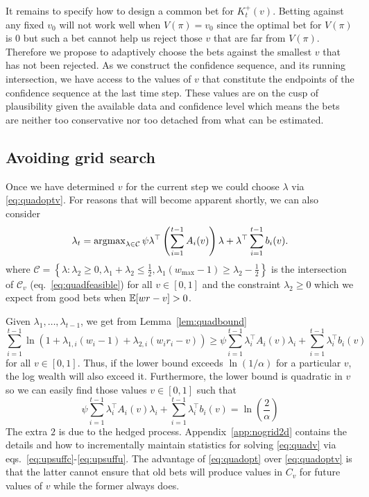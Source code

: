 It remains to specify how to design a common bet
for $K_t^{+}(v)$.
Betting against any fixed $v_0$ 
will not work well when $V(\pi)=v_0$
since the optimal bet for $V(\pi)$ is 0 but
such a bet cannot help us reject those $v$ that are far from
$V(\pi)$. Therefore we propose to adaptively choose
the bets against the smallest $v$ 
that has not been rejected. As we 
construct the confidence sequence, and its running 
intersection, we have access to the values of $v$
that constitute the endpoints of the confidence sequence
at the last time step. These values are on the cusp of
plausibility given the available data and confidence level
which means the bets are neither too conservative nor 
too detached from what can be estimated.

\subsection{Avoiding grid search}

Once we have determined $v$ for the current step we could 
choose $\lambda$ via \eqref{eq:quadoptv}. For reasons 
that will become apparent shortly, we can also consider
\begin{equation}
\lambda_t = \operatorname{argmax}_{\lambda \in \mathcal{C}}
\psi  \lambda^\top \left(\sum_{i=1}^{t-1} A_i(v)\right) \lambda 
+ \lambda^\top \sum_{i=1}^{t-1} b_i(v).
\label{eq:quadopt}
\end{equation}
where $\mathcal{C}=\left\{\lambda: \lambda_2\geq 0, 
\lambda_1 + \lambda_2 \leq \frac{1}{2},
\lambda_1 \left(w_{\max}-1\right) \geq \lambda_2 -\frac{1}{2}
\right\}$ is the intersection of $\mathcal{C}_v$ 
(eq.~\eqref{eq:quadfeasible}) for all $v \in [0,1]$ 
and the constraint $\lambda_2\geq 0$ which we expect
from good bets when $\mathbb{E}[wr-v]>0$. 

Given $\lambda_1,\ldots,\lambda_{t-1}$, we get from Lemma~\ref{lem:quadbound} 
\[
\sum_{i=1}^{t-1} \ln(1+\lambda_{1,i} (w_i-1)+\lambda_{2,i} (w_i r_i - v)) 
\geq
\psi  
 \sum_{i=1}^{t-1} \lambda_i^\top A_i(v)\lambda_i  +  \sum_{i=1}^{t-1} \lambda_i^\top b_i(v)
\]
for all $v \in [0,1]$. Thus, if the lower bound exceeds $\ln(1/\alpha)$ 
for a particular $v$, the log wealth will also exceed it. Furthermore,
the lower bound is quadratic in $v$ so we can easily find those values
$v \in [0,1]$ such that
\begin{equation}
   \psi  
 \sum_{i=1}^{t-1} \lambda_i^\top A_i(v)\lambda_i  +  \sum_{i=1}^{t-1} \lambda_i^\top b_i(v) = \ln\left(\frac{2}{\alpha}\right) 
 \label{eq:quadv}
\end{equation} 
The extra $2$ is due to the hedged process. 
Appendix~\ref{app:nogrid2d} contains the details and 
how to incrementally maintain statistics for solving
\eqref{eq:quadv} via eqs.~\eqref{eq:upsuffc}-\eqref{eq:upsuffu}.
The advantage of \eqref{eq:quadopt}
over \eqref{eq:quadoptv} is that the latter cannot 
ensure that old bets will produce values in $C_v$ for 
future values of $v$ while the former always does.

